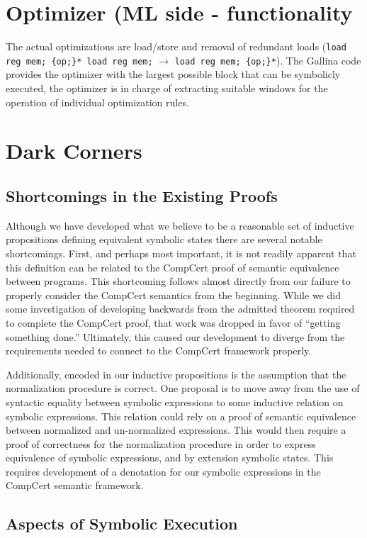 \documentclass{article}
\begin{document}
\section{Optimizer (ML side - functionality}
The actual optimizations are load/store and removal of redundant loads
({\tt load reg mem; \{op;\}* load reg mem;} $\rightarrow$ {\tt load reg
  mem; \{op;\}*}).  The Gallina code provides the optimizer with the
largest possible block that can be symbolicly executed, the optimizer
is in charge of extracting suitable windows for the operation of
individual optimization rules.

\section{Dark Corners}

\subsection{Shortcomings in the Existing Proofs}
Although we have developed what we believe to be a reasonable set of
inductive propositions defining equivalent symbolic states there are
several notable shortcomings. First, and perhaps most important, it is
not readily apparent that this definition can be related to the
CompCert proof of semantic equivalence between programs. This
shortcoming follows almost directly from our failure to properly
consider the CompCert semantics from the beginning. While we did some
investigation of developing backwards from the admitted theorem
required to complete the CompCert proof, that work was dropped in
favor of ``getting something done.'' Ultimately, this caused our
development to diverge from the requirements needed to connect to the
CompCert framework properly. 

Additionally, encoded in our inductive propositions is the assumption
that the normalization procedure is correct. One proposal is to move
away from the use of syntactic equality between symbolic expressions to
some inductive relation on symbolic expressions. This relation could
rely on a proof of semantic equivalence between normalized and
un-normalized  expressions. This would then require a proof of
correctness for the normalization procedure in order to express
equivalence of symbolic expressions, and by extension symbolic
states. This requires development of a denotation for our symbolic
expressions in the CompCert semantic framework.


\subsection{Aspects of Symbolic Execution}
\end{document}
